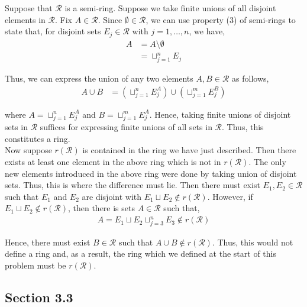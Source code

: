 \documentclass[12pt]{article}
\newenvironment{problem}[2][Problem]{\begin{trivlist}
\item[\hskip \labelsep {\bfseries #1}\hskip \labelsep {\bfseries #2.}]}{\end{trivlist}}
\begin{document}
\begin{problem}{7}
\end{problem}

Suppose that $\mathcal{R}$ is a semi-ring. Suppose we take finite unions of all disjoint elements in $\mathcal{R}$. Fix $A \in \mathcal{R}$. Since $\emptyset \in \mathcal{R}$, we can use property (3) of semi-rings to state that, for disjoint sets $E_j \in \mathcal{R}$ with $j = 1, \ldots, n$, we have,
\begin{align*}
A &= A \setminus \emptyset\\
&= \sqcup_{j=1}^n E_j
\end{align*}

Thus, we can express the union of any two elements $A, B \in \mathcal{R}$ as follows,
\begin{align*}
A \cup B &= (\sqcup_{j=1}^n E_j^A) \cup (\sqcup_{j=1}^m E_j^B)
\end{align*}

where $A = \sqcup_{j=1}^n E_j^A$ and $B = \sqcup_{j=1}^m E_j^A$. Hence, taking finite unions of disjoint sets in $\mathcal{R}$ suffices for expressing finite unions of all sets in $\mathcal{R}$. Thus, this constitutes a ring.\\

Now suppose $r(\mathcal{R})$ is contained in the ring we have just described. Then there exists at least one element in the above  ring which is not in $r(\mathcal{R})$. The only new elements introduced in the above ring were done by taking union of disjoint sets. Thus, this is where the difference must lie. Then there must exist $E_1, E_2 \in \mathcal{R}$ such that $E_1$ and $E_2$ are disjoint with $E_1 \sqcup E_2 \not\in r(\mathcal{R})$. However, if $E_1 \sqcup E_2 \not\in r(\mathcal{R})$, then there is sets $A \in \mathcal{R}$ such that,
\begin{align*}
A = E_1 \sqcup E_2 \sqcup_{j=3}^n E_3 \not\in r(\mathcal{R})
\end{align*}

Hence, there must exist $B \in \mathcal{R}$ such that $A \cup B \not\in r(\mathcal{R})$. Thus, this would not define a ring and, as a result, the ring which we defined at the start of this problem must be $r(\mathcal{R})$.

\subsection{Section 3.3}

\begin{problem}{1}
\end{problem}
\end{document}
